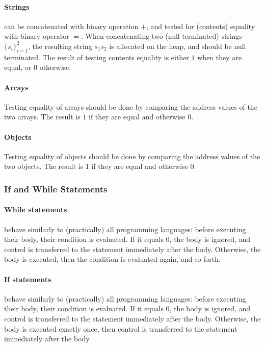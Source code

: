 \documentclass{article}
\begin{document}
\paragraph{Strings} can be concatenated with binary operation $+$,
and tested for (contents) equality with binary operator $=$.
When concatenating two (null terminated) strings $\{s_{i}\}_{i=1}^{2}$,
the resulting string $s_{1}s_{2}$ is allocated on the heap,
and should be null terminated. The result of testing contents equality
is either $1$ when they are equal, or $0$ otherwise.
\paragraph{Arrays}
Testing equality of arrays should be done by comparing the address values of the two arrays.
The result is $1$ if they are equal and otherwise $0$.
\paragraph{Objects}
Testing equality of objects should be done by comparing the address values of the two objects.
The result is $1$ if they are equal and otherwise $0$.

\subsubsection{If and While Statements}
\label{subsection_If_And_While_Statements}
\paragraph{While statements} behave similarly to (practically) all programming languages:
before executing their body, their condition is evaluated.
If it equals $0$, the body is ignored, and control is transferred
to the statement immediately after the body.
Otherwise, the body is executed, then the condition is evaluated again, and so forth. 
\paragraph{If statements} behave similarly to (practically) all programming languages:
before executing their body, their condition is evaluated.
If it equals $0$, the body is ignored, and control is transferred
to the statement immediately after the body.
Otherwise, the body is executed exactly once,
then control is transferred to the statement immediately after the body. 
\end{document}
